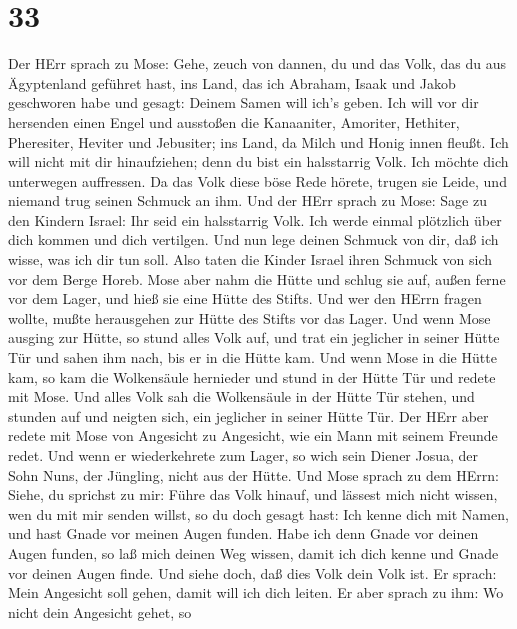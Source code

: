 \hypertarget{section-32}{%
\section{33}\label{section-32}}

 Der HErr sprach zu Mose: Gehe, zeuch von dannen, du und das
Volk, das du aus Ägyptenland geführet hast, ins Land, das ich Abraham,
Isaak und Jakob geschworen habe und gesagt: Deinem Samen will ich's
geben.  Ich will vor dir hersenden einen Engel und ausstoßen
die Kanaaniter, Amoriter, Hethiter, Pheresiter, Heviter und Jebusiter;
 ins Land, da Milch und Honig innen fleußt. Ich will nicht
mit dir hinaufziehen; denn du bist ein halsstarrig Volk. Ich möchte dich
unterwegen auffressen.  Da das Volk diese böse Rede hörete,
trugen sie Leide, und niemand trug seinen Schmuck an ihm. 
Und der HErr sprach zu Mose: Sage zu den Kindern Israel: Ihr seid ein
halsstarrig Volk. Ich werde einmal plötzlich über dich kommen und dich
vertilgen. Und nun lege deinen Schmuck von dir, daß ich wisse, was ich
dir tun soll.  Also taten die Kinder Israel ihren Schmuck
von sich vor dem Berge Horeb.  Mose aber nahm die Hütte und
schlug sie auf, außen ferne vor dem Lager, und hieß sie eine Hütte des
Stifts. Und wer den HErrn fragen wollte, mußte herausgehen zur Hütte des
Stifts vor das Lager.  Und wenn Mose ausging zur Hütte, so
stund alles Volk auf, und trat ein jeglicher in seiner Hütte Tür und
sahen ihm nach, bis er in die Hütte kam.  Und wenn Mose in
die Hütte kam, so kam die Wolkensäule hernieder und stund in der Hütte
Tür und redete mit Mose.  Und alles Volk sah die
Wolkensäule in der Hütte Tür stehen, und stunden auf und neigten sich,
ein jeglicher in seiner Hütte Tür.  Der HErr aber redete
mit Mose von Angesicht zu Angesicht, wie ein Mann mit seinem Freunde
redet. Und wenn er wiederkehrete zum Lager, so wich sein Diener Josua,
der Sohn Nuns, der Jüngling, nicht aus der Hütte.  Und Mose
sprach zu dem HErrn: Siehe, du sprichst zu mir: Führe das Volk hinauf,
und lässest mich nicht wissen, wen du mit mir senden willst, so du doch
gesagt hast: Ich kenne dich mit Namen, und hast Gnade vor meinen Augen
funden.  Habe ich denn Gnade vor deinen Augen funden, so
laß mich deinen Weg wissen, damit ich dich kenne und Gnade vor deinen
Augen finde. Und siehe doch, daß dies Volk dein Volk ist. 
Er sprach: Mein Angesicht soll gehen, damit will ich dich leiten.
 Er aber sprach zu ihm: Wo nicht dein Angesicht gehet, so
